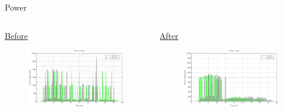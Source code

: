 \documentclass[aspectratio=169,dvipsnames]{beamer}
\begin{document}
\begin{frame}[label={sec:orga5a6c12}]{Power}
\begin{columns}
\begin{column}{0.5\columnwidth}
\begin{center} {\small \underline{Before}}\end{center}

\begin{figure}[htpb]
\centering
    \includegraphics[width=\textwidth]{img/sa-pap-paper-bad/power-sa}
\end{figure}
\end{column}

\begin{column}{0.5\columnwidth}
\begin{center} {\small \underline{After}}\end{center}

\begin{figure}[htpb]
\centering
    \includegraphics[width=\textwidth]{img/sa-pap-paper-good/power-sa}
\end{figure}
\end{column}
\end{columns}
\end{frame}
\end{document}
